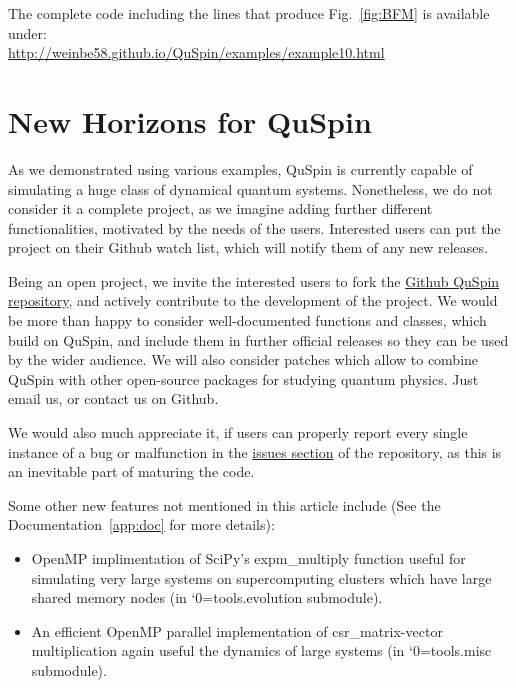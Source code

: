 \documentclass{SciPost}
\newcommand\0{\scalebox{-1}[1]{0}}
\let\svttfamily\ttfamily
\renewcommand\ttfamily{\svttfamily\catcode`0=\active }
\renewcommand\texttt{\bgroup\ttfamily\texttthelp}
\def\texttthelp#1{#1\egroup}
\begin{document}
The complete code including the lines that produce Fig.~\ref{fig:BFM} is available under:\\

\href{http://weinbe58.github.io/QuSpin/examples/example10.html}{http://weinbe58.github.io/QuSpin/examples/example10.html}\\



\section{New Horizons for QuSpin}
\label{sec:outro}
As we demonstrated using various examples, QuSpin is currently capable of simulating a huge class of dynamical quantum systems. Nonetheless, we do not consider it a complete project, as we imagine adding further different functionalities, motivated by the needs of the users. Interested users can put the project on their Github watch list, which will notify them of any new releases.

Being an open project, we invite the interested users to fork the \href{https://github.com/weinbe58/QuSpin}{Github QuSpin repository}, and actively contribute to the development of the project. We would be more than happy to consider well-documented functions and classes, which build on QuSpin, and include them in further official releases so they can be used by the wider audience. We will also consider patches which allow to combine QuSpin with other open-source packages for studying quantum physics. Just email us, or contact us on Github.

We would also much appreciate it, if users can properly report every single instance of a bug or malfunction in the \href{https://github.com/weinbe58/QuSpin/issues}{issues section} of the repository, as this is an inevitable part of maturing the code.

Some other new features not mentioned in this article include (See the Documentation~\ref{app:doc} for more details):

\begin{itemize}
	\item OpenMP implimentation of SciPy's expm\_multiply function useful for simulating very large systems on supercomputing clusters which have large shared memory nodes (in \texttt{tools.evolution} submodule).
	\item An efficient OpenMP parallel implementation of csr\_matrix-vector multiplication again useful the dynamics of large systems (in \texttt{tools.misc} submodule).
\end{itemize}
\end{document}
